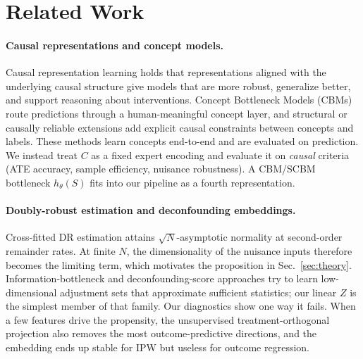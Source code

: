 \documentclass{article}
\begin{document}
\section{Related Work}

\paragraph{Causal representations and concept models.}
Causal representation learning holds that representations aligned with the
underlying causal structure give models that are more robust, generalize
better, and support reasoning about interventions.\cite{scholkopf2021towards}
Concept Bottleneck Models (CBMs) route predictions through a human-meaningful
concept layer,\cite{koh2020concept} and structural or causally reliable
extensions add explicit causal constraints between concepts and
labels.\cite{fromCausalToConcept} These methods learn concepts end-to-end and
are evaluated on prediction. We instead treat $C$ as a fixed expert encoding
and evaluate it on \emph{causal} criteria (ATE accuracy, sample efficiency,
nuisance robustness). A CBM/SCBM bottleneck $h_\theta(S)$ fits into our
pipeline as a fourth representation.

\paragraph{Doubly-robust estimation and deconfounding embeddings.}
Cross-fitted DR estimation attains $\sqrt{N}$-asymptotic normality at
second-order remainder rates.\cite{chernozhukov2018double} At finite $N$, the
dimensionality of the nuisance inputs therefore becomes the limiting term,
which motivates the proposition in Sec.~\ref{sec:theory}.
Information-bottleneck and deconfounding-score
approaches\cite{kuang2020information,deconfoundingScores} try to learn
low-dimensional adjustment sets that approximate sufficient statistics; our
linear $Z$ is the simplest member of that family. Our diagnostics show one way
it fails. When a few features drive the propensity, the unsupervised
treatment-orthogonal projection also removes the most outcome-predictive
directions, and the embedding ends up stable for IPW but useless for outcome
regression.
\end{document}
